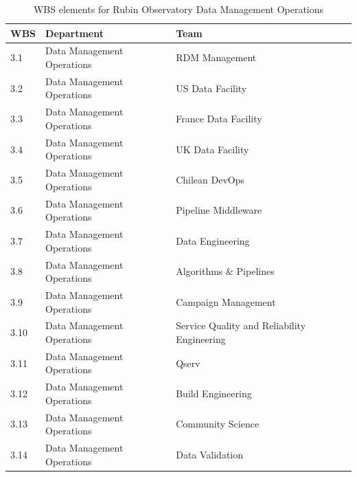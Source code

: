 \normalsize \begin{longtable} {|p{}|l|l|} \caption{WBS elements for Rubin Observatory Data Management Operations \label{tab:dmwbs}}\\ 
\hline 
\textbf{WBS}&\textbf{Department}&\textbf{Team} \\ \hline
{3.1}&{Data Management Operations}&{RDM Management} \\ \hline
{3.2}&{Data Management Operations}&{US Data Facility} \\ \hline
{3.3}&{Data Management Operations}&{France Data Facility} \\ \hline
{3.4}&{Data Management Operations}&{UK Data Facility} \\ \hline
{3.5}&{Data Management Operations}&{Chilean DevOps} \\ \hline
{3.6}&{Data Management Operations}&{Pipeline Middleware} \\ \hline
{3.7}&{Data Management Operations}&{Data Engineering} \\ \hline
{3.8}&{Data Management Operations}&{Algorithms \& Pipelines} \\ \hline
{3.9}&{Data Management Operations}&{Campaign Management} \\ \hline
{3.10}&{Data Management Operations}&{Service Quality and Reliability Engineering} \\ \hline
{3.11}&{Data Management Operations}&{Qserv} \\ \hline
{3.12}&{Data Management Operations}&{Build Engineering} \\ \hline
{3.13}&{Data Management Operations}&{Community Science} \\ \hline
{3.14}&{Data Management Operations}&{Data Validation} \\ \hline
\end{longtable} \normalsize
